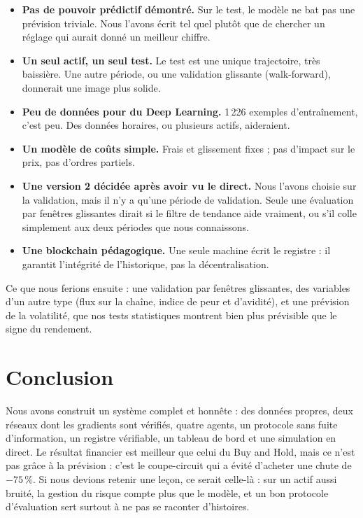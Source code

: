 \documentclass[11pt,a4paper]{article}
\begin{document}
\begin{itemize}
\item \textbf{Pas de pouvoir prédictif démontré.} Sur le test, le modèle ne bat pas une prévision triviale. Nous l'avons écrit tel quel plutôt que de chercher un
réglage qui aurait donné un meilleur chiffre.
\item \textbf{Un seul actif, un seul test.} Le test est une unique trajectoire, très baissière. Une autre période, ou une validation glissante (walk-forward),
donnerait une image plus solide.
\item \textbf{Peu de données pour du Deep Learning.} 1\,226 exemples d'entraînement, c'est peu. Des données horaires, ou plusieurs actifs, aideraient.
\item \textbf{Un modèle de coûts simple.} Frais et glissement fixes ; pas d'impact sur le prix, pas d'ordres partiels.
\item \textbf{Une version 2 décidée après avoir vu le direct.} Nous l'avons choisie sur la validation, mais il n'y a qu'une période de validation.
Seule une évaluation par fenêtres glissantes dirait si le filtre de tendance aide vraiment, ou s'il colle simplement aux deux périodes que nous connaissons.
\item \textbf{Une blockchain pédagogique.} Une seule machine écrit le registre : il garantit l'intégrité de l'historique, pas la décentralisation.
\end{itemize}

Ce que nous ferions ensuite : une validation par fenêtres glissantes, des variables d'un autre type (flux sur la chaîne, indice de peur et d'avidité),
et une prévision de la volatilité, que nos tests statistiques montrent bien plus prévisible que le signe du rendement.

\section{Conclusion}

Nous avons construit un système complet et honnête : des données propres, deux réseaux dont les gradients sont vérifiés, quatre agents, un protocole sans fuite
d'information, un registre vérifiable, un tableau de bord et une simulation en direct. Le résultat financier est meilleur que celui du Buy and Hold, mais ce
n'est pas grâce à la prévision : c'est le coupe-circuit qui a évité d'acheter une chute de $-75\,\%$. Si nous devions retenir une leçon, ce serait celle-là :
sur un actif aussi bruité, la gestion du risque compte plus que le modèle, et un bon protocole d'évaluation sert surtout à ne pas se raconter d'histoires.
\end{document}

